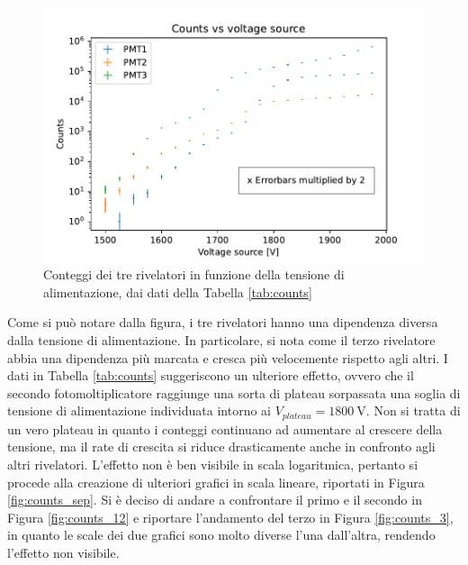 \documentclass[10pt,a4paper]{article}
\begin{document}
\begin{figure}[h]
    \centering
    \includegraphics[width=0.8\columnwidth]{img/counts123_new.pdf}
    \caption{Conteggi dei tre rivelatori in funzione della tensione di alimentazione, dai dati della Tabella \ref{tab:counts}}
    \label{fig:counts}
\end{figure}

Come si può notare dalla figura, i tre rivelatori hanno una dipendenza diversa dalla tensione di alimentazione. In particolare, si nota come il terzo rivelatore abbia una dipendenza più marcata e cresca più velocemente rispetto agli altri. I dati in Tabella \ref{tab:counts} suggeriscono un ulteriore effetto, ovvero che il secondo fotomoltiplicatore raggiunge una sorta di plateau sorpassata una soglia di tensione di alimentazione individuata intorno ai $V_{plateau}=\SI{1800}{\volt}$. Non si tratta di un vero plateau in quanto i conteggi continuano ad aumentare al crescere della tensione, ma il rate di crescita si riduce drasticamente anche in confronto agli altri rivelatori. L'effetto non è ben visibile in scala logaritmica, pertanto si procede alla creazione di ulteriori grafici in scala lineare, riportati in Figura \ref{fig:counts_sep}. Si è deciso di andare a confrontare il primo e il secondo in Figura \ref{fig:counts_12} e riportare l'andamento del terzo in Figura \ref{fig:counts_3}, in quanto le scale dei due grafici sono molto diverse l'una dall'altra, rendendo l'effetto non visibile.
\end{document}
